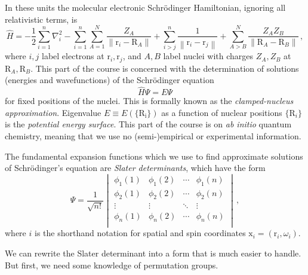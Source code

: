 \documentclass{article}
\theoremstyle{plain}\theoremheaderfont{\normalfont\itshape}\theorembodyfont{\rmfamily}\theoremseparator{.}\newtheorem*{rem}{Remark}\newtheorem*{ex}{Example}\newtheorem*{proof}{Proof}\newtheorem*{altp}{Alternative proof}
\theoremstyle{plain}\theoremheaderfont{\normalfont\bfseries}\theorembodyfont{\rmfamily}\theoremseparator{.}\newtheorem{thm}{Theorem}[section]\newtheorem{lem}[thm]{Lemma}\newtheorem{prop}[thm]{Proposition}\newtheorem*{cor}{Corollary}\newtheorem{defn}[thm]{Definition}\newtheorem{clm}[thm]{Claim}\newtheorem{clminproof}{Claim}
\theoremstyle{break}\theoremheaderfont{\normalfont\itshape}\theorembodyfont{\rmfamily}\theoremseparator{.\medskip}\newtheorem*{proofskip}{Proof}\newtheorem*{exs}{Examples}\newtheorem*{rems}{Remarks}
\theoremstyle{break}\theoremheaderfont{\normalfont\bfseries}\theorembodyfont{\rmfamily}\theoremseparator{.\medskip}\newtheorem{lemskip}[thm]{Lemma}\newtheorem{defnskip}[thm]{Definition}\newtheorem{propskip}[thm]{Proposition}\newtheorem{thmskip}[thm]{Theorem}
\numberwithin{equation}{section}
\newcommand{\vb}[1]{\bm{\mathrm{#1}}}
\newcommand{\norm}[1]{\left\| #1 \right\|}
\newcommand{\laplacian}{\nabla^2}
\begin{document}
    In these units the molecular electronic Schr\"{o}dinger Hamiltonian, ignoring all relativistic terms, is
    \begin{equation}
        \hat{H}=-\frac{1}{2}\sum_{i=1}^{n}\laplacian_i-\sum_{i=1}^{n}\sum_{A=1}^{N}\frac{Z_A}{\norm{\vb{r}_i-\vb{R}_A}}+\sum_{i>j}^{n}\frac{1}{\norm{\vb{r}_i-\vb{r}_j}}+\sum_{A>B}^{N}\frac{Z_AZ_B}{\norm{\vb{R}_A-\vb{R}_B}}\,,
    \end{equation}
    where \(i,j\) label electrons at \(\vb{r}_i,\vb{r}_j\), and \(A,B\) label nuclei with charges \(Z_A,Z_B\) at \(\vb{R}_A,\vb{R}_B\). This part of the course is concerned with the determination of solutions (energies and wavefunctions) of the Schr\"{o}dinger equation
    \begin{equation}
        \hat{H}\Psi=E\Psi
    \end{equation}
    for fixed positions of the nuclei. This is formally known as the \textit{clamped-nucleus approximation}. Eigenvalue \(E\equiv E(\{\vb{R_i}\})\) as a function of nuclear positions \(\{\vb{R}_i\}\) is the \textit{potential energy surface}. This part of the course is on \textit{ab initio} quantum chemistry, meaning that we use no (semi-)empirical or experimental information.

    The fundamental expansion functions which we use to find approximate solutions of Schr\"{o}dinger's equation are \textit{Slater determinants}, which have the form
    \begin{equation}
        \Psi=\frac{1}{\sqrt{n!}}\begin{vmatrix}
            \phi_1(1) & \phi_1(2) & \cdots & \phi_1(n)\\
            \phi_2(1) & \phi_2(2) & \cdots & \phi_2(n)\\
            \vdots & \vdots & \ddots & \vdots \\
            \phi_n(1) & \phi_n(2) & \cdots & \phi_n(n)\\
        \end{vmatrix}\,,
    \end{equation}
    where \(i\) is the shorthand notation for spatial and spin coordinates \(\vb{x}_i=(\vb{r}_i,\omega_i)\).

    We can rewrite the Slater determinant into a form that is much easier to handle. But first, we need some knowledge of permutation groups.
\end{document}
